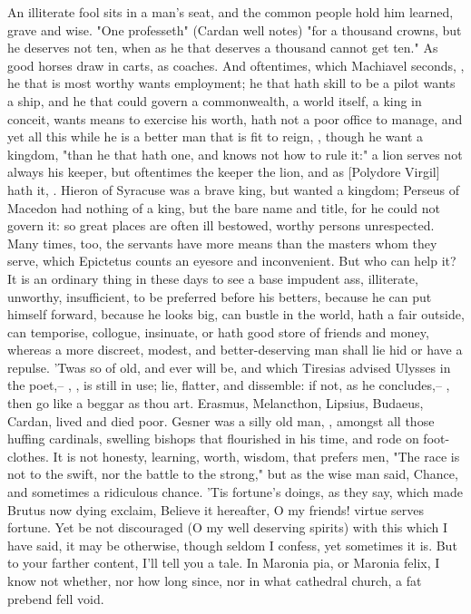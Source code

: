 {An illiterate fool sits in a man's seat, and the common people hold him learned, grave and wise. "One professeth" (Cardan well notes) "for a thousand crowns, but he deserves not ten, when as he that deserves a thousand cannot get ten."  As good horses draw in carts, as coaches. And oftentimes, which Machiavel seconds, , he that is most worthy wants employment; he that hath skill to be a pilot wants a ship, and he that could govern a commonwealth, a world itself, a king in conceit, wants means to exercise his worth, hath not a poor office to manage, and yet all this while he is a better man that is fit to reign, , though he want a kingdom, "than he that hath one, and knows not how to rule it:" a lion serves not always his keeper, but oftentimes the keeper the lion, and as [Polydore Virgil] hath it, . Hieron of Syracuse was a brave king, but wanted a kingdom; Perseus of Macedon had nothing of a king, but the bare name and title, for he could not govern it: so great places are often ill bestowed, worthy persons unrespected. Many times, too, the servants have more means than the masters whom they serve, which Epictetus counts an eyesore and inconvenient. But who can help it? It is an ordinary thing in these days to see a base impudent ass, illiterate, unworthy, insufficient, to be preferred before his betters, because he can put himself forward, because he looks big, can bustle in the world, hath a fair outside, can temporise, collogue, insinuate, or hath good store of friends and money, whereas a more discreet, modest, and better-deserving man shall lie hid or have a repulse. 'Twas so of old, and ever will be, and which Tiresias advised Ulysses in the poet,-- , \etc{}, is still in use; lie, flatter, and dissemble: if not, as he concludes,-- , then go like a beggar as thou art. Erasmus, Melancthon, Lipsius, Budaeus, Cardan, lived and died poor. Gesner was a silly old man, , amongst all those huffing cardinals, swelling bishops that flourished in his time, and rode on foot-clothes. It is not honesty, learning, worth, wisdom, that prefers men, "The race is not to the swift, nor the battle to the strong," but as the wise man said, Chance, and sometimes a ridiculous chance.  'Tis fortune's doings, as they say, which made Brutus now dying exclaim,  Believe it hereafter, O my friends! virtue serves fortune. Yet be not discouraged (O my well deserving spirits) with this which I have said, it may be otherwise, though seldom I confess, yet sometimes it is. But to your farther content, I'll tell you a tale. In Maronia pia, or Maronia felix, I know not whether, nor how long since, nor in what cathedral church, a fat prebend fell void. }
